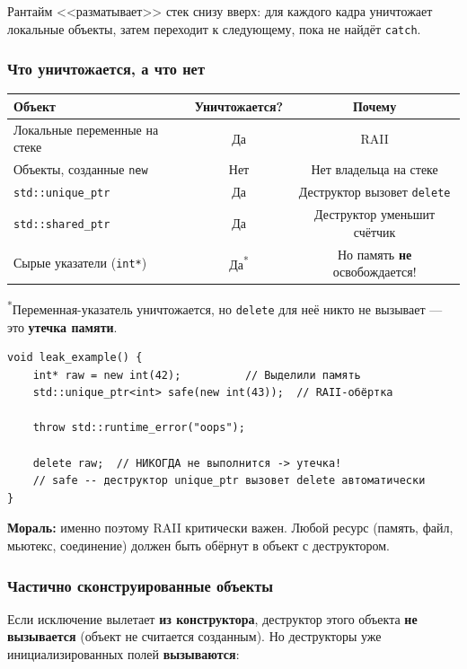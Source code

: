 \documentclass[a4paper,12pt]{article}
\begin{document}
Рантайм <<разматывает>> стек снизу вверх: для каждого кадра уничтожает
локальные объекты, затем переходит к следующему, пока не найдёт \texttt{catch}.

\subsubsection{Что уничтожается, а что нет}

\begin{center}
\begin{tabular}{lcc}
\toprule
\textbf{Объект} & \textbf{Уничтожается?} & \textbf{Почему} \\
\midrule
Локальные переменные на стеке  & Да  & RAII \\
Объекты, созданные \texttt{new}  & Нет & Нет владельца на стеке \\
\texttt{std::unique\_ptr}        & Да  & Деструктор вызовет \texttt{delete} \\
\texttt{std::shared\_ptr}        & Да  & Деструктор уменьшит счётчик \\
Сырые указатели (\texttt{int*})  & Да\textsuperscript{*} & Но память \textbf{не} освобождается! \\
\bottomrule
\end{tabular}
\end{center}

\textsuperscript{*}Переменная-указатель уничтожается, но \texttt{delete} для неё
никто не вызывает --- это \textbf{утечка памяти}.

\begin{lstlisting}
void leak_example() {
    int* raw = new int(42);          // Выделили память
    std::unique_ptr<int> safe(new int(43));  // RAII-обёртка

    throw std::runtime_error("oops");

    delete raw;  // НИКОГДА не выполнится -> утечка!
    // safe -- деструктор unique_ptr вызовет delete автоматически
}
\end{lstlisting}

\textbf{Мораль:} именно поэтому RAII критически важен. Любой ресурс
(память, файл, мьютекс, соединение) должен быть обёрнут в объект с деструктором.

\subsubsection{Частично сконструированные объекты}

Если исключение вылетает \textbf{из конструктора}, деструктор этого объекта
\textbf{не вызывается} (объект не считается созданным). Но деструкторы уже
инициализированных полей \textbf{вызываются}:
\end{document}
